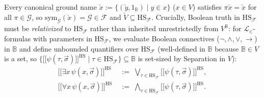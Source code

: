 \documentclass[10pt,twoside,openright]{book}
\providecommand{\llbracket}{\mathopen{[\![}}
\providecommand{\rrbracket}{\mathclose{]\!]}}
\theoremstyle{crmplain}
\theoremstyle{crmdef}
\theoremstyle{crmremark}
\begin{document}
Every canonical ground name $\check{x} := \{(\check{y}, 1_{\mathbb{B}}) \mid y \in x\}$ ($x \in V$) satisfies $\pi\check{x} = \check{x}$ for all $\pi \in \mathcal{G}$, so $\mathrm{sym}_{\mathcal{G}}(\check{x}) = \mathcal{G} \in \mathcal{F}$ and $\check{V} \subseteq \mathrm{HS}_{\mathcal{F}}$. Crucially, Boolean truth in $\mathrm{HS}_{\mathcal{F}}$ must be \emph{relativized} to $\mathrm{HS}_{\mathcal{F}}$ rather than inherited unrestrictedly from $V^{\mathbb{B}}$: for $\mathcal{L}_\in$-formulas with parameters in $\mathrm{HS}_{\mathcal{F}}$, we evaluate Boolean connectives ($\neg, \wedge, \vee, \to$) in $\mathbb{B}$ and define unbounded quantifiers over $\mathrm{HS}_{\mathcal{F}}$ (well-defined in $\mathbb{B}$ because $\mathbb{B} \in V$ is a set, so $\{\llbracket \psi(\tau, \vec{\sigma}) \rrbracket^{\mathrm{HS}} \mid \tau \in \mathrm{HS}_{\mathcal{F}}\} \subseteq \mathbb{B}$ is set-sized by Separation in $V$):
\[
  \begin{aligned}
    \llbracket \exists x\,\psi(x, \vec{\sigma}) \rrbracket^{\mathrm{HS}} &\;:=\; \bigvee_{\tau \in \mathrm{HS}_{\mathcal{F}}} \llbracket \psi(\tau, \vec{\sigma}) \rrbracket^{\mathrm{HS}}, \\
    \llbracket \forall x\,\psi(x, \vec{\sigma}) \rrbracket^{\mathrm{HS}} &\;:=\; \bigwedge_{\tau \in \mathrm{HS}_{\mathcal{F}}} \llbracket \psi(\tau, \vec{\sigma}) \rrbracket^{\mathrm{HS}}.
  \end{aligned}
\]
\end{document}
